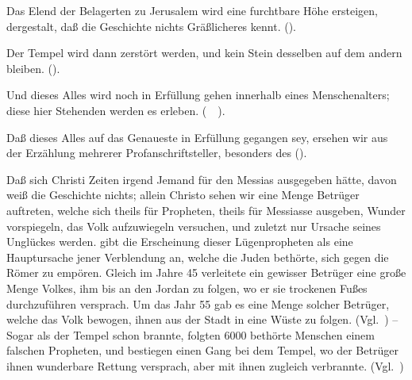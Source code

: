 \begin{aufza}
\begin{aufzb}
\item Das Elend der Belagerten zu Jerusalem wird eine furchtbare Höhe ersteigen, dergestalt, daß die Geschichte nichts Gräßlicheres kennt.  ().
\item Der Tempel wird dann zerstört werden, und kein Stein desselben auf dem andern bleiben.  ().~
\item Und dieses Alles wird noch in Erfüllung gehen innerhalb eines Menschenalters; diese hier Stehenden werden es erleben.  (\ \ ).
\end{aufzb}
\item Daß dieses Alles auf das Genaueste in Erfüllung gegangen sey, ersehen wir aus der Erzählung mehrerer Profanschriftsteller, besonders des  ().
\begin{aufzb}
\item Daß sich  Christi Zeiten irgend Jemand für den Messias ausgegeben hätte, davon weiß die Geschichte nichts; allein  Christo sehen wir eine Menge Betrüger auftreten, welche sich theils für Propheten, theils für Messiasse ausgeben, Wunder vorspiegeln, das Volk aufzuwiegeln versuchen, und zuletzt nur Ursache seines Unglückes werden.  gibt die Erscheinung dieser Lügenpropheten als eine Hauptursache jener Verblendung an, welche die Juden bethörte, sich gegen die Römer zu empören. Gleich im Jahre 45 verleitete ein gewisser Betrüger  eine große Menge Volkes, ihm bis an den Jordan zu folgen, wo er sie trockenen Fußes durchzuführen versprach. Um das Jahr 55 gab es eine Menge solcher Betrüger, welche das Volk bewogen, ihnen aus der Stadt in eine Wüste zu folgen. (Vgl.\ ) -- Sogar als der Tempel schon brannte, folgten 6000 bethörte Menschen einem falschen Propheten, und bestiegen einen Gang bei dem Tempel, wo der Betrüger ihnen wunderbare Rettung versprach, aber mit ihnen zugleich verbrannte. (Vgl.\ )

\end{aufzb}
\end{aufza}
